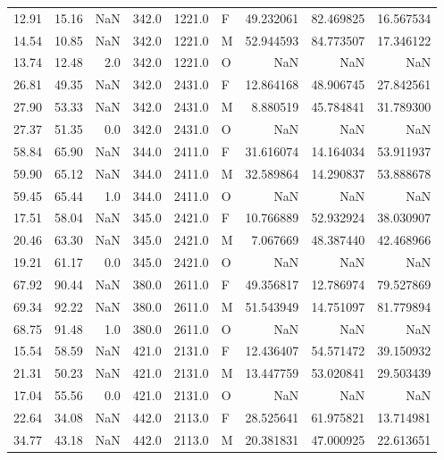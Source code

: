 \begin{table}
\begin{tabular}{rrrrrlrrr}
12.91 &  15.16 &      NaN &  342.0 & 1221.0 &      F & 49.232061 & 82.469825 & 16.567534 \\
14.54 &  10.85 &      NaN &  342.0 & 1221.0 &      M & 52.944593 & 84.773507 & 17.346122 \\
13.74 &  12.48 &      2.0 &  342.0 & 1221.0 &      O &       NaN &       NaN &       NaN \\
26.81 &  49.35 &      NaN &  342.0 & 2431.0 &      F & 12.864168 & 48.906745 & 27.842561 \\
27.90 &  53.33 &      NaN &  342.0 & 2431.0 &      M &  8.880519 & 45.784841 & 31.789300 \\
27.37 &  51.35 &      0.0 &  342.0 & 2431.0 &      O &       NaN &       NaN &       NaN \\
58.84 &  65.90 &      NaN &  344.0 & 2411.0 &      F & 31.616074 & 14.164034 & 53.911937 \\
59.90 &  65.12 &      NaN &  344.0 & 2411.0 &      M & 32.589864 & 14.290837 & 53.888678 \\
59.45 &  65.44 &      1.0 &  344.0 & 2411.0 &      O &       NaN &       NaN &       NaN \\
17.51 &  58.04 &      NaN &  345.0 & 2421.0 &      F & 10.766889 & 52.932924 & 38.030907 \\
20.46 &  63.30 &      NaN &  345.0 & 2421.0 &      M &  7.067669 & 48.387440 & 42.468966 \\
19.21 &  61.17 &      0.0 &  345.0 & 2421.0 &      O &       NaN &       NaN &       NaN \\
67.92 &  90.44 &      NaN &  380.0 & 2611.0 &      F & 49.356817 & 12.786974 & 79.527869 \\
69.34 &  92.22 &      NaN &  380.0 & 2611.0 &      M & 51.543949 & 14.751097 & 81.779894 \\
68.75 &  91.48 &      1.0 &  380.0 & 2611.0 &      O &       NaN &       NaN &       NaN \\
15.54 &  58.59 &      NaN &  421.0 & 2131.0 &      F & 12.436407 & 54.571472 & 39.150932 \\
21.31 &  50.23 &      NaN &  421.0 & 2131.0 &      M & 13.447759 & 53.020841 & 29.503439 \\
17.04 &  55.56 &      0.0 &  421.0 & 2131.0 &      O &       NaN &       NaN &       NaN \\
22.64 &  34.08 &      NaN &  442.0 & 2113.0 &      F & 28.525641 & 61.975821 & 13.714981 \\
34.77 &  43.18 &      NaN &  442.0 & 2113.0 &      M & 20.381831 & 47.000925 & 22.613651 \\

\end{tabular}
\end{table}
